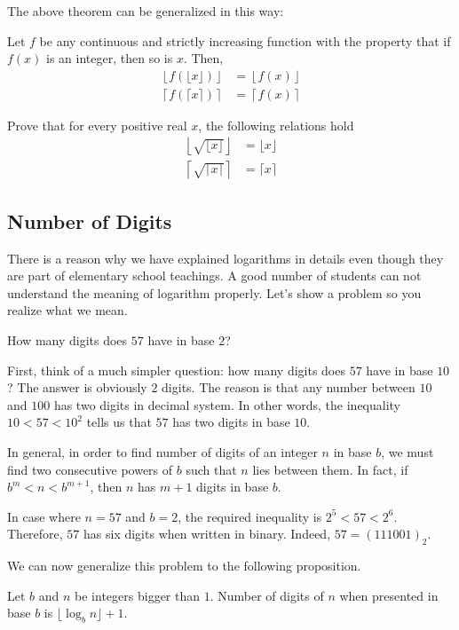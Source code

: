 \documentclass{subfile}
\begin{document}
The above theorem can be generalized in this way:
\begin{theorem}
	Let $f$ be any continuous and strictly increasing function with the property that if $f(x)$ is an integer, then so is $x$. Then,
	\begin{align*}
		\left\lfloor  f(\lfloor x \rfloor)\right\rfloor
			& = \left\lfloor  f(x) \right\rfloor \\
		\left\lceil f(\lceil x \rceil)\right\rceil
			& = \left\lceil f(x) \right\rceil
	\end{align*}
\end{theorem}

\begin{problem}
	Prove that for every positive real $x$, the following relations hold
	\begin{align*}
		\left\lfloor  \sqrt {\lfloor x \rfloor} \right\rfloor  &= \lfloor x \rfloor\\
		\left\lceil \sqrt{ \lceil x \rceil} \right\rceil  &= \lceil x \rceil
	\end{align*}
\end{problem}


\subsection{Number of Digits}
	There is a reason why we have explained logarithms in details even though they are part of elementary school teachings. A good number of students can not understand the meaning of logarithm properly. Let's show a problem so you realize what we mean.
	\begin{question}
		How many digits does $57$ have in base $2$?
	\end{question}

	\begin{solution}
		First, think of a much simpler question: how many digits does $57$ have in base $10$? The answer is obviously $2$ digits. The reason is that any number between $10$ and $100$ has two digits in decimal system. In other words, the inequality $10<57<10^2$ tells us that $57$ has two digits in base $10$.

		In general, in order to find number of digits of an integer $n$ in base $b$, we must find two consecutive powers of $b$ such that $n$ lies between them. In fact, if $b^m < n <b^{m+1}$, then $n$ has $m+1$ digits in base $b$.

		In case where $n=57$ and $b=2$, the required inequality is $2^5 < 57 <2^6$. Therefore, $57$ has six digits when written in binary. Indeed, $57 = (111001)_2$.
	\end{solution}
	We can now generalize this problem to the following proposition.
	\begin{proposition}
		Let $b$ and $n$ be integers bigger than $1$. Number of digits of $n$ when presented in base $b$ is $\lfloor \log_b n\rfloor +1$.
	\end{proposition}
\end{document}
